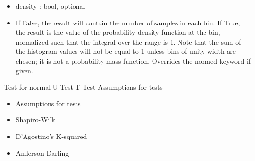 \documentclass{beamer}
\begin{document}
\begin{frame}{}
    \begin{center}
    \end{center}
\end{frame}

\begin{frame}{}
    \begin{center}
    \begin{itemize}
        \item density : bool, optional

        \item If False, the result will contain the number of samples in each bin. If True, the result is the value of the probability density function at the bin, normalized such that the integral over the range is 1. Note that the sum of the histogram values will not be equal to 1 unless bins of unity width are chosen; it is not a probability mass function. Overrides the normed keyword if given.
    \end{itemize}
    \end{center}
\end{frame}

\begin{frame}{}
    \begin{center}
        Test for normal
        U-Test
        T-Test
        Assumptions for tests
    \end{center}
\end{frame}

\begin{frame}{}
    \begin{center}
    \begin{itemize}
        \item Assumptions for tests
        \item Shapiro-Wilk
        \item D'Agostino's K-squared
        \item Anderson-Darling
    \end{itemize}
    \end{center}
\end{frame}
\end{document}
